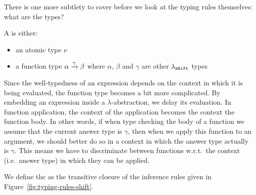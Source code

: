 There is one more subtlety to cover before we look at the typing rules
themselves: what are the types?

\begin{definition}
  A  is either:
  \begin{itemize}
  \item an atomic type $\nu$
  \item a function type $\alpha \xrightarrow{\gamma} \beta$ where $\alpha$, $\beta$
    and $\gamma$ are other $\lambda_{\mathtt{shift}}$ types
  \end{itemize}
\end{definition}

Since the well-typedness of an expression depends on the context in which
it is being evaluated, the function type becomes a bit more complicated. By
embedding an expression inside a $\lambda$-abstraction, we delay its
evaluation. In function application, the context of the application becomes
the context the function body. In other words, if when type checking the
body of a function we assume that the current answer type is $\gamma$, then
when we apply this function to an argument, we should better do so in a
context in which the answer type actually is $\gamma$. This means we have
to discriminate between functions w.r.t.\ the context (i.e.\ answer type) in
which they can be applied.

\begin{definition}
  We define the  as the
  transitive closure of the inference rules given in
  Figure~\ref{fig:typing-rules-shift}.
\end{definition}

